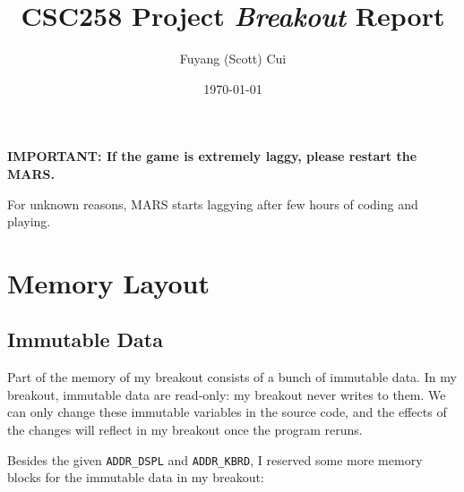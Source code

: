 \documentclass{article}
\title{CSC258 Project \textit{Breakout} Report}
\author{Fuyang (Scott) Cui}
\date{\today}
\newcommand{\code}[1]{\texttt{#1}}
\begin{document}
\maketitle 
\tableofcontents
\newpage

\textbf{IMPORTANT: If the game is extremely laggy, please restart the MARS.}

For unknown reasons, MARS starts laggying after few hours of coding and playing.

\section{Memory Layout}

\subsection{Immutable Data}

Part of the memory of my breakout consists of a bunch of immutable data. In my breakout, immutable data are read-only: my breakout never writes to them. We can only change these immutable variables in the source code, and the effects of the changes will reflect in my breakout once the program reruns.

Besides the given \code{ADDR\_DSPL} and \code{ADDR\_KBRD}, I reserved some more memory blocks for the immutable data in my breakout:
\end{document}
